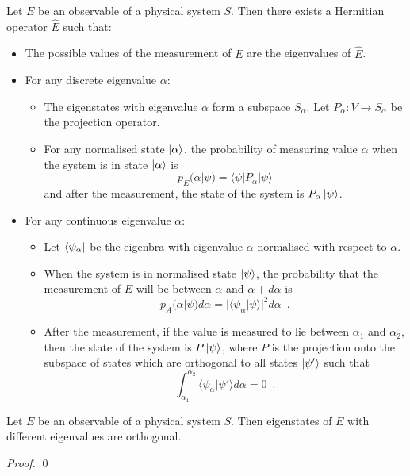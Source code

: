 \begin{ax}
Let $E$ be an observable of a physical system $S$. Then there exists a Hermitian operator $\hat{E}$ such that:
\begin{itemize}
\item The possible values of the measurement of $E$ are the eigenvalues of $\hat{E}$.
\item For any discrete eigenvalue $\alpha$:
\begin{itemize}
\item The eigenstates with eigenvalue $\alpha$ form a subspace $S_\alpha$. Let $P_\alpha : V \rightarrow S_\alpha$ be the projection operator.
\item For any normalised state $\left| {\alpha} \right\rangle$, the probability of measuring value $\alpha$ when the system is in state $\left| {\alpha} \right\rangle$ is
\[ p_E(\alpha | \psi) = \langle \psi | P_\alpha | \psi \rangle \]
and after the measurement, the state of the system is $P_\alpha \left| {\psi} \right\rangle$.
\end{itemize}
\item For any continuous eigenvalue $\alpha$:
\begin{itemize}
\item Let $\left\langle {\psi_\alpha} \right|$ be the eigenbra with eigenvalue $\alpha$ normalised with respect to $\alpha$.
\item When the system is in normalised state $\left| {\psi} \right\rangle$, the probability that the measurement of $E$ will be between $\alpha$ and $\alpha + d \alpha$ is
\[ p_A(\alpha | \psi) d \alpha = |\langle \psi_\alpha | \psi \rangle|^2 d \alpha \enspace . \]
\item After the measurement, if the value is measured to lie between $\alpha_1$ and $\alpha_2$, then the state of the system is $P \left| {\psi} \right\rangle$, where $P$ is the projection onto the subspace of states which are orthogonal to all states $\left| {\psi'} \right\rangle$ such that
\[ \int_{\alpha_1}^{\alpha_2} \langle \psi_\alpha | \psi' \rangle d \alpha = 0 \enspace . \]
\end{itemize}
\end{itemize}
\end{ax}

\begin{prop}
\label{prop:eigenstates_orthogonal}
Let $E$ be an observable of a physical system $S$. Then eigenstates of $E$ with different eigenvalues are orthogonal.
\end{prop}

\begin{proof}
\pf
{}
\qed
\end{proof}


